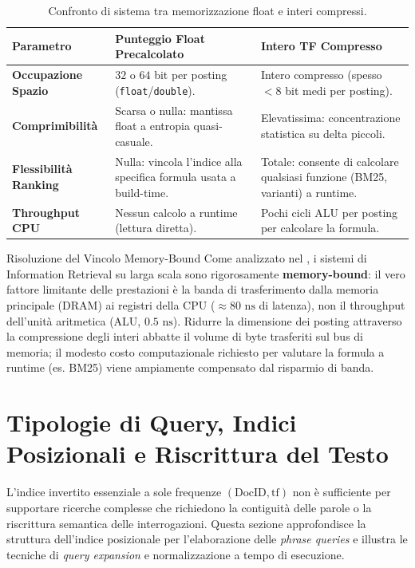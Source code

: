 \begin{table}[H]
\centering
\small
\begin{tabularx}{\linewidth}{l X X}
\toprule
\textbf{Parametro} & \textbf{Punteggio Float Precalcolato} & \textbf{Intero TF Compresso} \\
\midrule
\textbf{Occupazione Spazio} & $32$ o $64$ bit per posting (\texttt{float}/\texttt{double}). & Intero compresso (spesso $< 8$ bit medi per posting). \\
\addlinespace
\textbf{Comprimibilit\`a} & Scarsa o nulla: mantissa float a entropia quasi-casuale. & Elevatissima: concentrazione statistica su delta piccoli. \\
\addlinespace
\textbf{Flessibilit\`a Ranking} & Nulla: vincola l'indice alla specifica formula usata a build-time. & Totale: consente di calcolare qualsiasi funzione (BM25, varianti) a runtime. \\
\addlinespace
\textbf{Throughput CPU} & Nessun calcolo a runtime (lettura diretta). & Pochi cicli ALU per posting per calcolare la formula. \\
\bottomrule
\end{tabularx}
\caption{Confronto di sistema tra memorizzazione float e interi compressi.}
\label{tab:float-vs-int}
\end{table}

\begin{noteblock}{Risoluzione del Vincolo Memory-Bound}
Come analizzato nel , i sistemi di Information Retrieval su larga scala sono rigorosamente \textbf{memory-bound}: il vero fattore limitante delle prestazioni \`e la banda di trasferimento dalla memoria principale (DRAM) ai registri della CPU ($\approx 80\text{ ns}$ di latenza), non il throughput dell'unit\`a aritmetica (ALU, $0.5\text{ ns}$). Ridurre la dimensione dei posting attraverso la compressione degli interi abbatte il volume di byte trasferiti sul bus di memoria; il modesto costo computazionale richiesto per valutare la formula a runtime (es. BM25) viene ampiamente compensato dal risparmio di banda.
\end{noteblock}

\FloatBarrier
\section{Tipologie di Query, Indici Posizionali e Riscrittura del Testo}
\label{sec:query-expansion-posizionali}

L'indice invertito essenziale a sole frequenze $(\text{DocID}, \text{tf})$ non \`e sufficiente per supportare ricerche complesse che richiedono la contiguit\`a delle parole o la riscrittura semantica delle interrogazioni. Questa sezione approfondisce la struttura dell'indice posizionale per l'elaborazione delle \textit{phrase queries} e illustra le tecniche di \textit{query expansion} e normalizzazione a tempo di esecuzione.

